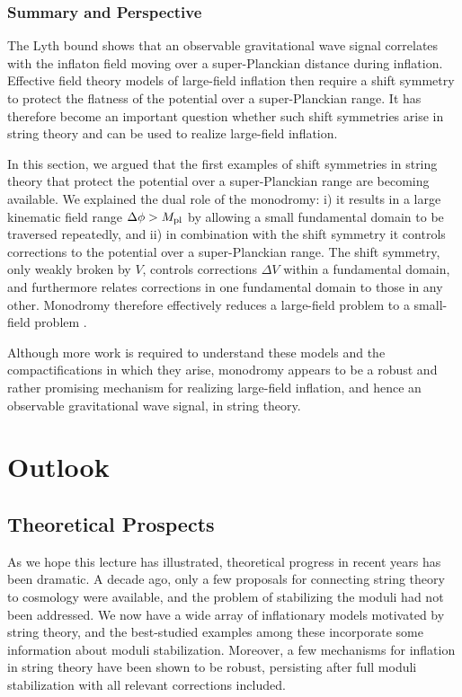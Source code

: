 \documentclass[12pt,letterpaper,rotate]{article}
\begin{document}
{\subsubsection{Summary and Perspective}
\label{sec:axionS}

The Lyth bound shows that an observable gravitational wave signal correlates with the inflaton field moving over a super-Planckian distance during inflation.
Effective field theory models of large-field inflation then require a shift symmetry to protect the flatness of the potential over a super-Planckian range.
It has therefore become an important question whether such shift symmetries arise in string theory and can be used to realize large-field inflation.

In this section, we argued that the
first examples of shift symmetries in string theory that protect the potential over a super-Planckian range are becoming available.
We explained the dual role of the monodromy: i) it results in a large kinematic field range $\Delta \phi > M_{\rm pl}$  by allowing a small fundamental domain to be traversed repeatedly, and ii) in combination with the shift symmetry it controls corrections to the potential over a super-Planckian range.  
The shift symmetry, only weakly broken by $V$, controls corrections $\Delta V$ within a fundamental domain, and 
furthermore relates corrections in one fundamental domain to those in any other.
Monodromy therefore effectively reduces a large-field problem to a small-field problem \cite{Silverstein:2008sg}.

Although more work is required to understand these models and the compactifications in which they arise,
monodromy appears to be a robust and rather promising mechanism for realizing large-field inflation, and hence an observable gravitational wave signal, in string theory.



\section{Outlook}

\subsection{Theoretical Prospects}

As we hope this lecture has illustrated, theoretical progress in recent years has been dramatic. A decade ago, only a few proposals for connecting string theory to cosmology were available, and the problem of stabilizing the moduli had not been addressed. We now have a wide array of inflationary models motivated by string theory, and the best-studied examples among these incorporate some information about moduli stabilization.  Moreover, a few mechanisms for inflation in string theory have been shown to be robust, persisting after full moduli stabilization with all relevant corrections included.

}
\end{document}
